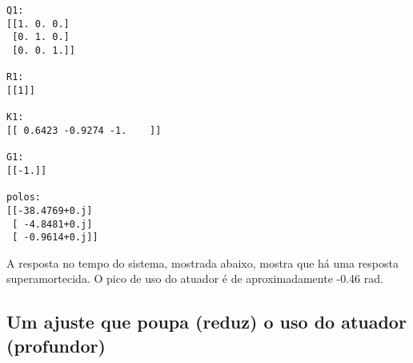\documentclass[13pt]{article}
\begin{document}
\begin{Verbatim}[commandchars=\\\{\}]
Q1:
[[1. 0. 0.]
 [0. 1. 0.]
 [0. 0. 1.]]

R1:
[[1]]

K1:
[[ 0.6423 -0.9274 -1.    ]]

G1:
[[-1.]]

polos:
[[-38.4769+0.j]
 [ -4.8481+0.j]
 [ -0.9614+0.j]]
\end{Verbatim}

A resposta no tempo do sistema, mostrada abaixo, mostra que há uma
resposta superamortecida. O pico de uso do atuador é de aproximadamente
-0.46 rad.

\begin{figure}[H]
    \centering


    
\end{figure}

\hypertarget{um-ajuste-que-poupa-reduz-o-uso-do-atuador-profundor}{%
    \subsection{Um ajuste que poupa (reduz) o uso do atuador
        (profundor)}}
\end{document}
